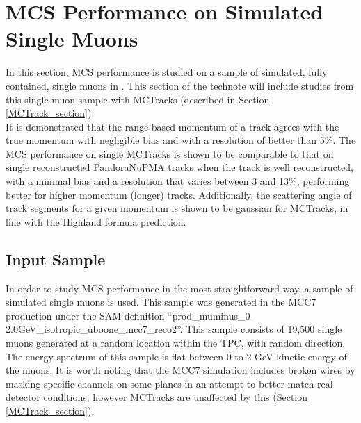 
\section{MCS Performance on Simulated Single Muons}\label{singlemuon_MC_section}

In this section, MCS performance is studied on a sample of simulated, fully contained, single muons in {\ub}. This section of the technote will include studies from this single muon sample with {\sc MCTracks} (described in Section \ref{MCTrack_section}).\\

It is demonstrated that the range-based momentum of a track agrees with the true momentum with negligible bias and with a resolution of better than 5\%. The MCS performance on single {\sc MCTracks} is shown to be comparable to that on single reconstructed PandoraNuPMA tracks when the track is well reconstructed, with a minimal bias and a resolution that varies between 3 and 13\%, performing better for higher momentum (longer) tracks. Additionally, the scattering angle of track segments for a given momentum is shown to be gaussian for {\sc MCTracks}, in line with the Highland formula prediction.


\subsection{Input Sample}\label{SingleMu_Input_Sample_section}
In order to study MCS performance in the most straightforward way, a sample of simulated single muons is used. This sample was generated in the {\ub} MCC7 production under the SAM definition ``prod\_muminus\_0-2.0GeV\_isotropic\_uboone\_mcc7\_reco2''. This sample consists of 19,500 single muons generated at a random location within the {\ub} TPC, with random direction. The energy spectrum of this sample is flat between 0 to 2 GeV kinetic energy of the muons. It is worth noting that the MCC7 simulation includes broken wires by masking specific channels on some planes in an attempt to better match real detector conditions, however {\sc MCTracks} are unaffected by this (Section \ref{MCTrack_section}).\\


